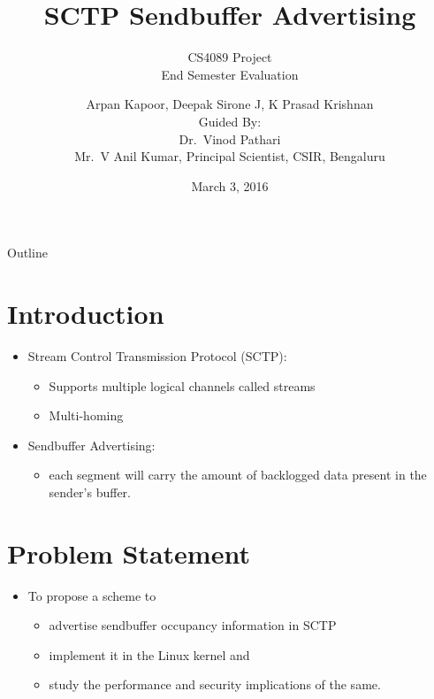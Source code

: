 \documentclass{beamer}
\title{SCTP Sendbuffer Advertising}
\subtitle{CS4089 Project\\
	End Semester Evaluation}
\author{Arpan Kapoor, Deepak Sirone J, K Prasad Krishnan\\
	Guided By:\\ Dr.~Vinod Pathari\\
	Mr.~V Anil Kumar, Principal Scientist, CSIR, Bengaluru}
\date{March 3, 2016}
\begin{document}
\begin{frame}
	\titlepage
\end{frame}

\begin{frame}{Outline}
	\tableofcontents
\end{frame}

\section{Introduction}
\begin{frame}{\insertsection}

\begin{itemize}
	\item Stream Control Transmission Protocol (SCTP):
	\begin{itemize}
		\item Supports multiple logical channels called streams
		\item Multi-homing
	\end{itemize}
\end{itemize}

\begin{itemize}
	\item Sendbuffer Advertising:
	\begin{itemize}
		\item each segment will carry the amount of backlogged data
			present in the sender's buffer.
	\end{itemize}
\end{itemize}

\end{frame}

\section{Problem Statement}
\begin{frame}{\insertsection}
\begin{itemize}
\item To propose a scheme to
\begin{itemize}
\item advertise sendbuffer occupancy information in SCTP
\item implement it in the Linux kernel and
\item study the performance and security implications of the same.
\end{itemize}
\end{itemize}
\end{frame}
\end{document}
